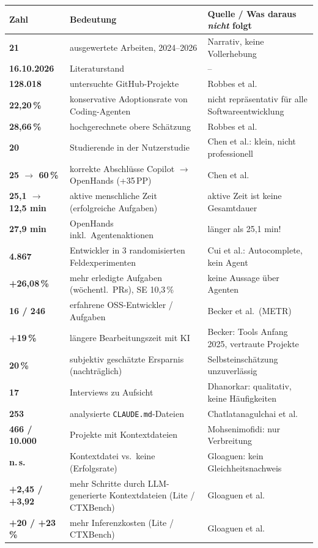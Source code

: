\documentclass[12pt,a4paper]{article}
\newcommand{\pp}{\,PP}
\begin{document}
\begin{longtable}{@{}>{\bfseries}p{2.7cm}p{7.6cm}p{5.6cm}@{}}
\toprule
Zahl & Bedeutung & Quelle / Was daraus \emph{nicht} folgt \\
\midrule
\endhead
21 & ausgewertete Arbeiten, 2024--2026 & Narrativ, keine Vollerhebung \\
16.10.2026 & Literaturstand & -- \\
128.018 & untersuchte GitHub-Projekte & Robbes et al. \\
22,20\,\% & konservative Adoptionsrate von Coding-Agenten & nicht repräsentativ für alle Softwareentwicklung \\
28,66\,\% & hochgerechnete obere Schätzung & Robbes et al. \\
20 & Studierende in der Nutzerstudie & Chen et al.: klein, nicht professionell \\
25 $\to$ 60\,\% & korrekte Abschlüsse Copilot $\to$ OpenHands (+35\pp) & Chen et al. \\
25,1 $\to$ 12,5 min & aktive menschliche Zeit (erfolgreiche Aufgaben) & aktive Zeit ist keine Gesamtdauer \\
27,9 min & OpenHands inkl.\ Agentenaktionen & länger als 25,1 min! \\
4.867 & Entwickler in 3 randomisierten Feldexperimenten & Cui et al.: Autocomplete, kein Agent \\
+26,08\,\% & mehr erledigte Aufgaben (wöchentl.\ PRs), SE 10,3\,\% & keine Aussage über Agenten \\
16 / 246 & erfahrene OSS-Entwickler / Aufgaben & Becker et al.\ (METR) \\
+19\,\% & längere Bearbeitungszeit mit KI & Becker: Tools Anfang 2025, vertraute Projekte \\
20\,\% & subjektiv geschätzte Ersparnis (nachträglich) & Selbsteinschätzung unzuverlässig \\
17 & Interviews zu Aufsicht & Dhanorkar: qualitativ, keine Häufigkeiten \\
253 & analysierte \texttt{CLAUDE.md}-Dateien & Chatlatanagulchai et al. \\
466 / 10.000 & Projekte mit Kontextdateien & Mohsenimofidi: nur Verbreitung \\
n.\,s. & Kontextdatei vs.\ keine (Erfolgsrate) & Gloaguen: kein Gleichheitsnachweis \\
+2,45 / +3,92 & mehr Schritte durch LLM-generierte Kontextdateien (Lite / CTXBench) & Gloaguen et al. \\
+20 / +23\,\% & mehr Inferenzkosten (Lite / CTXBench) & Gloaguen et al. \\

\end{longtable}
\end{document}
